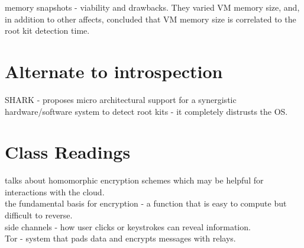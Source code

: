 \documentclass{article}
\begin{document}
\noindent\cite{toldinas:kaunas2009-VM-rootkits} memory snapshots - viability and drawbacks. They varied VM memory size, and, in addition to other affects, concluded that VM memory size is correlated to the root kit detection time.

\section{Alternate to introspection}

\noindent\cite{vasisht:micro2008-SHARK} SHARK - proposes micro architectural support for a synergistic hardware/software system to detect root kits - it completely distrusts the OS.\\

\section{Class Readings}

\noindent\cite{gentry:acm2010-homomorphic} talks about homomorphic encryption schemes which may be helpful for interactions with the cloud.\\

\noindent\cite{rivers:acm1978-onewayf} the fundamental basis for encryption - a function that is easy to compute but difficult to reverse.\\

\noindent\cite{chen:sp2010-side-channels} side channels - how user clicks or keystrokes can reveal information.\\

\noindent\cite{dingledine:ssym2004-tor} Tor - system that pads data and encrypts messages with relays.\\



  


\newpage
\onecolumn
\appendix
\end{document}
